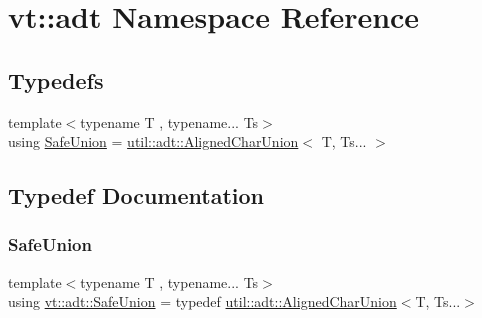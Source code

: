\hypertarget{namespacevt_1_1adt}{}\section{vt\+:\+:adt Namespace Reference}
\label{namespacevt_1_1adt}
\subsection*{Typedefs}
\begin{DoxyCompactItemize}
\item 
{\footnotesize template$<$typename T , typename... Ts$>$ }\\using \hyperlink{namespacevt_1_1adt_ad2a7bbcb5f4735ae9d847f96ee62f144}{Safe\+Union} = \hyperlink{structvt_1_1util_1_1adt_1_1_aligned_char_union}{util\+::adt\+::\+Aligned\+Char\+Union}$<$ T, Ts... $>$
\end{DoxyCompactItemize}


\subsection{Typedef Documentation}
\mbox{\label{namespacevt_1_1adt_ad2a7bbcb5f4735ae9d847f96ee62f144}} 
\subsubsection{\texorpdfstring{Safe\+Union}{SafeUnion}}
{\footnotesize\ttfamily template$<$typename T , typename... Ts$>$ \\
using \hyperlink{namespacevt_1_1adt_ad2a7bbcb5f4735ae9d847f96ee62f144}{vt\+::adt\+::\+Safe\+Union} = typedef \hyperlink{structvt_1_1util_1_1adt_1_1_aligned_char_union}{util\+::adt\+::\+Aligned\+Char\+Union}$<$T, Ts...$>$}

